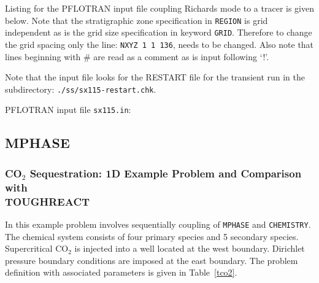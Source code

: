 Listing for the PFLOTRAN input file coupling Richards mode to a tracer is given below. Note that the stratigraphic zone specification in {\tt REGION} is grid independent as is the grid size specification in keyword {\tt GRID}. Therefore to change the grid spacing only the line: {\tt NXYZ 1 1 136}, needs to be changed. Also note that lines beginning with \# are read as a comment as is input following `!'.

Note that the input file looks for the RESTART file for the transient run in the subdirectory: {\small\tt ./ss/sx115-restart.chk}.
\bigskip

\noindent PFLOTRAN input file {\tt sx115.in}: 
\scriptsize



\normalsize

\clearpage

\subsection{MPHASE}
\label{subsection_mphase}

\subsubsection{CO$_2$ Sequestration: 1D Example Problem and Comparison with\\ TOUGHREACT}

In this example problem involves sequentially coupling of {\tt MPHASE} and {\tt CHEMISTRY}. The chemical system consists of four primary species and 5 secondary species. Supercritical CO$_2$ is injected into a well located at the west boundary. Dirichlet pressure boundary conditions are imposed at the east boundary. The problem definition with associated parameters is given in Table~\ref{tco2}.

